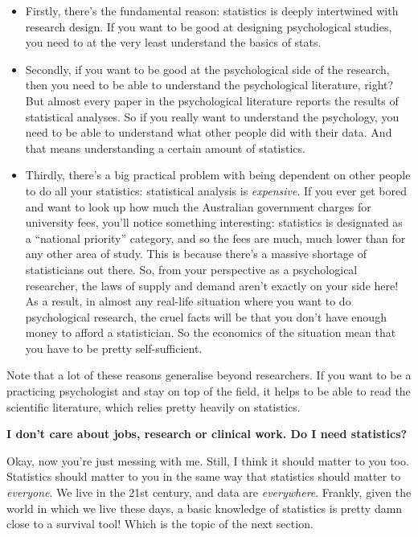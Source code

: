 \documentclass[
  a4paper,
]{book}
\providecommand{\tightlist}{%
  \setlength{\itemsep}{0pt}\setlength{\parskip}{0pt}}\usepackage{longtable,booktabs,array}
\begin{document}
\begin{itemize}
\tightlist
\item
  Firstly, there's the fundamental reason: statistics is deeply
  intertwined with research design. If you want to be good at designing
  psychological studies, you need to at the very least understand the
  basics of stats.
\item
  Secondly, if you want to be good at the psychological side of the
  research, then you need to be able to understand the psychological
  literature, right? But almost every paper in the psychological
  literature reports the results of statistical analyses. So if you
  really want to understand the psychology, you need to be able to
  understand what other people did with their data. And that means
  understanding a certain amount of statistics.
\item
  Thirdly, there's a big practical problem with being dependent on other
  people to do all your statistics: statistical analysis is
  \emph{expensive}. If you ever get bored and want to look up how much
  the Australian government charges for university fees, you'll notice
  something interesting: statistics is designated as a ``national
  priority'' category, and so the fees are much, much lower than for any
  other area of study. This is because there's a massive shortage of
  statisticians out there. So, from your perspective as a psychological
  researcher, the laws of supply and demand aren't exactly on your side
  here! As a result, in almost any real-life situation where you want to
  do psychological research, the cruel facts will be that you don't have
  enough money to afford a statistician. So the economics of the
  situation mean that you have to be pretty self-sufficient.
\end{itemize}

Note that a lot of these reasons generalise beyond researchers. If you
want to be a practicing psychologist and stay on top of the field, it
helps to be able to read the scientific literature, which relies pretty
heavily on statistics.

\textbf{I don't care about jobs, research or clinical work. Do I need
statistics?}

Okay, now you're just messing with me. Still, I think it should matter
to you too. Statistics should matter to you in the same way that
statistics should matter to \emph{everyone}. We live in the 21st
century, and data are \emph{everywhere}. Frankly, given the world in
which we live these days, a basic knowledge of statistics is pretty damn
close to a survival tool! Which is the topic of the next section.
\end{document}
